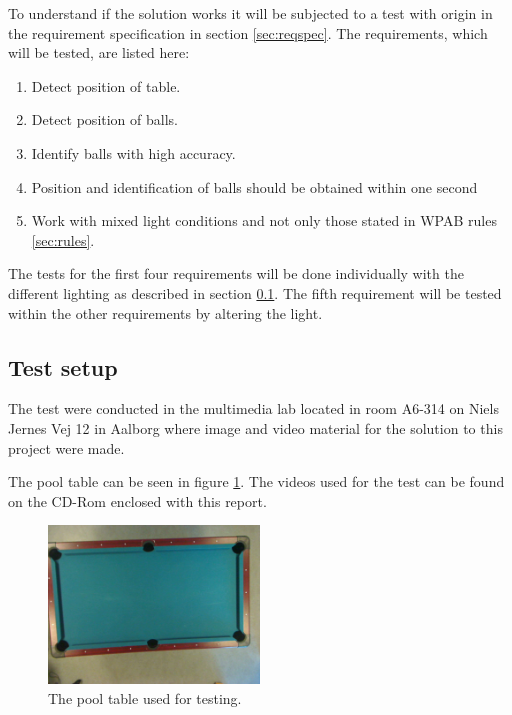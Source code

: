 To understand if the solution works it will be subjected to a test with origin in the requirement specification in section \ref{sec:reqspec}. The requirements, which will be tested, are listed here:

\begin{enumerate}
\setlength{\itemsep}{0mm}
	\item Detect position of table.
	\item Detect position of balls.
	\item Identify balls with high accuracy.
	\item Position and identification of balls should be obtained within one second
	\item Work with mixed light conditions and not only those stated in WPAB rules \ref{sec:rules}.
\end{enumerate}

The tests for the first four requirements will be done individually with the different lighting as described in section \ref{sec:testsetup}. The fifth requirement will be tested within the other requirements by altering the light.

\subsection{Test setup}
\label{sec:testsetup}
The test were conducted in the multimedia lab located in room A6-314 on Niels Jernes Vej 12 in Aalborg where image and video material for the solution to this project were made. 

The pool table can be seen in figure \ref{fig:pooltableimg}. The videos used for the test can be found on the CD-Rom enclosed with this report.

\begin{figure}[H]
\begin{center}
\leavevmode
\includegraphics[width=0.5\textwidth]{images/test/light/input}
\end{center}
   \caption{The pool table used for testing.}
  \label{fig:pooltableimg}
\end{figure} 

